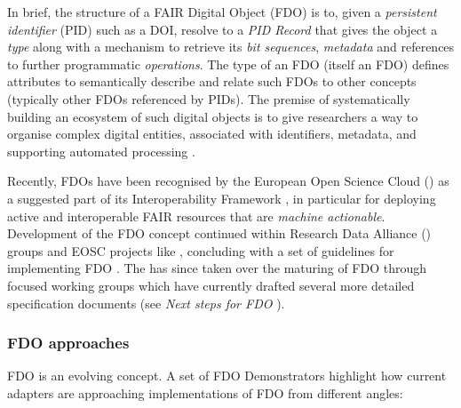 In brief, the structure of a FAIR Digital Object (FDO) is to, given a \emph{persistent identifier} (PID) such as a DOI, resolve to a \emph{PID Record} that gives the object a \emph{type} along with a mechanism to retrieve its \emph{bit sequences}, \emph{metadata} and references to further programmatic \emph{operations}. The type of an FDO (itself an FDO) defines attributes to semantically describe and relate such FDOs to other concepts (typically other FDOs referenced by PIDs). The premise of systematically building an ecosystem of such digital objects is to give researchers a way to organise complex digital entities, associated with identifiers, metadata, and supporting automated processing \cite{wittenburgDigitalObjectsDrivers2019a}.

Recently, FDOs have been recognised by the European Open Science Cloud () as a suggested part of its Interoperability Framework \cite{eosc-interop-framework}, in particular for deploying active and interoperable FAIR resources that are \emph{machine actionable}. Development of the FDO concept continued within Research Data Alliance () groups and EOSC projects like , concluding with a set of guidelines for implementing FDO \cite{bonino2019}. The  has since taken over the maturing of FDO through focused working groups which have currently drafted several more detailed specification documents (see \emph{Next steps for FDO} ).

\subsubsection{FDO approaches}\label{ch3:fdo-approaches}

FDO is an evolving concept. A set of FDO Demonstrators \cite{wittenburgFAIRDigitalObject2022b} highlight how current adapters are approaching implementations of FDO from different angles:

